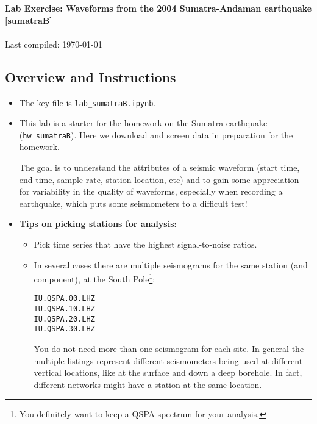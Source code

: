 \documentclass[11pt,titlepage,fleqn]{article}
\newcommand{\tfile}{{\tt lab\_sumatraB.ipynb}}
\begin{document}

\begin{spacing}{1.2} 
\centering
{\large \bf Lab Exercise: Waveforms from the 2004 Sumatra-Andaman earthquake [sumatraB]} \\
\cltag\ \\
Last compiled: \today
\end{spacing}

\subsection*{Overview and Instructions}

\begin{itemize}
\item The key file is \tfile.

\item This lab is a starter for the homework on the Sumatra earthquake (\verb+hw_sumatraB+). Here we download and screen data in preparation for the homework.

The goal is to understand the attributes of a seismic waveform (start time, end time, sample rate, station location, etc) and to gain some appreciation for variability in the quality of waveforms, especially when recording a  earthquake, which puts some seismometers to a difficult test!


\item {\bf Tips on picking stations for analysis}:
\begin{itemize}
\item Pick time series that have the highest signal-to-noise ratios.
\item In several cases there are multiple seismograms for the same station (and component), \eg at the South Pole\footnote{You definitely want to keep a QSPA spectrum for your analysis.}:
%
\begin{spacing}{1.0}
\begin{verbatim}
IU.QSPA.00.LHZ
IU.QSPA.10.LHZ
IU.QSPA.20.LHZ
IU.QSPA.30.LHZ
\end{verbatim}
\end{spacing}
%
You do not need more than one seismogram for each site. In general the multiple listings represent different seismometers being used at different vertical locations, like at the surface and down a deep borehole. In fact, different networks might have a station at the same location.


\end{itemize}
\end{itemize}
\end{document}

